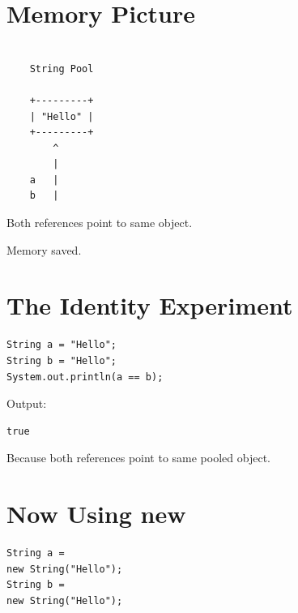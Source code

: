 \documentclass[11pt,a4paper]{book}
\begin{document}

\section{Memory Picture}

\begin{verbatim}

    String Pool

    +---------+
    | "Hello" |
    +---------+
        ^
        |
    a   |
    b   |

\end{verbatim}


Both references point to same object.


Memory saved.


\section{The Identity Experiment}

\begin{verbatim}
String a = "Hello";
String b = "Hello";
System.out.println(a == b);
\end{verbatim}


Output:

\begin{verbatim}
true
\end{verbatim}


Because both references point to same pooled object.


\section{Now Using new}

\begin{verbatim}
String a =
new String("Hello");
String b =
new String("Hello");
\end{verbatim}
\end{document}
